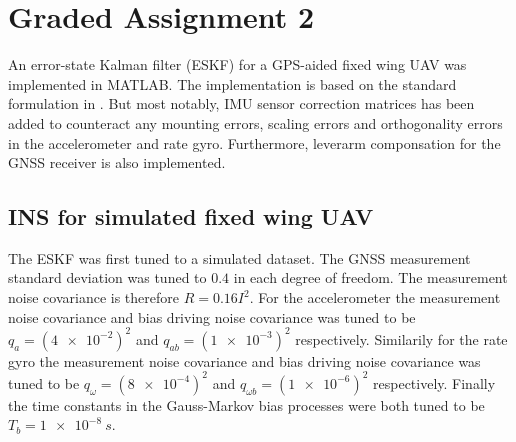 \section{Graded Assignment 2}\label{sec:graded_assignment_2}


An error-state Kalman filter (ESKF) for a GPS-aided fixed wing UAV was implemented in MATLAB. The implementation is based on the standard formulation in \cite{Sola}. But most notably, IMU sensor correction matrices has been added to counteract any mounting errors, scaling errors and orthogonality errors in the accelerometer and rate gyro. Furthermore, leverarm componsation for the GNSS receiver is also implemented.

\subsection{INS for simulated fixed wing UAV}





The ESKF was first tuned to a simulated dataset. The GNSS measurement standard deviation was tuned to $0.4$ in each degree of freedom. The measurement noise covariance is therefore $R=0.16 I ^2$. For the accelerometer the measurement noise covariance and bias driving noise covariance was tuned to be $q_{a} = (\SI{4e-2})^2$ and $ q_{ab} = (\SI{1e-3})^2$ respectively. Similarily for the rate gyro the measurement noise covariance and bias driving noise covariance was tuned to be $q_{\omega} = (\SI{8e-4})^2$ and $q_{\omega b} = (\SI{1e-6})^2$ respectively. Finally the time constants in the Gauss-Markov bias processes were both tuned to be $T_b = \SI{1e-8}{s}$.

